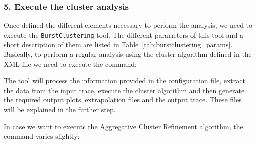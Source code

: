 \documentclass[a4paper, 12pt]{article}
\begin{document}
\subsubsection*{5. Execute the cluster analysis}

Once defined the different elements necessary to perform the analysis, we
need to execute the \texttt{BurstClustering} tool. The different parameters 
of this tool and a short description of them are listed in 
Table~\ref{tab:burstclustering_params}. Basically, to perform a regular 
analysis using the cluster algorithm defined in the XML file we need to 
execute the command:

\begin{figure}[!h]
  

\end{figure}

The tool will process the information provided in the configuration file,
extract the data from the input trace, execute the cluster algorithm and then
generate the required output plots, extrapolation files and the output trace.
These files will be explained in the further step.

In case we want to execute the Aggregative Cluster Refinement algorithm, the
command varies slightly:

\begin{figure}[!h]
  

\end{figure}
\end{document}
